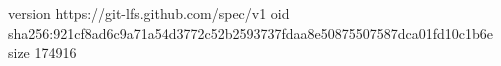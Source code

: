 version https://git-lfs.github.com/spec/v1
oid sha256:921cf8ad6c9a71a54d3772c52b2593737fdaa8e50875507587dca01fd10c1b6e
size 174916
